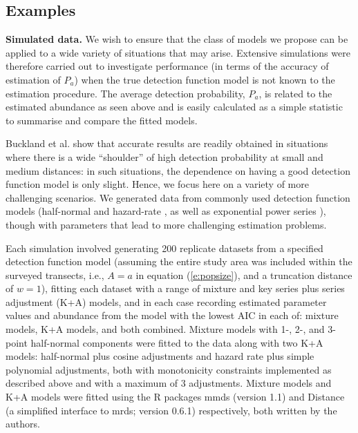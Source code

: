 \documentclass[10pt]{article}
\begin{document}
\subsection*{Examples}

\textbf{Simulated data.} We wish to ensure that the class of models we propose can be applied to a wide variety of situations that may arise. Extensive simulations were therefore carried out to investigate performance (in terms of the accuracy of estimation of $P_a$) when the true detection function model is not known to the estimation procedure. The average detection probability, $P_a$, is related to the estimated abundance as seen above and is easily calculated as a simple statistic to summarise and compare the fitted models.

Buckland et al. \cite{Buckland:2001vm} show that accurate results are readily obtained in situations where there is a wide ``shoulder'' of high detection probability at small and medium distances: in such situations, the dependence on having a good detection function model is only slight.  Hence, we focus here on a variety of more challenging scenarios. We generated data from commonly used detection function models (half-normal and hazard-rate \cite{Buckland:2001vm}, as well as exponential power series \cite{Otto:1990kk}), though with parameters that lead to more challenging estimation problems.

Each simulation involved generating 200 replicate datasets from a specified detection function model (assuming the entire study area was included within the surveyed transects, i.e., $A=a$ in equation (\ref{e:popsize}), and a truncation distance of $w=1$), fitting each dataset with a range of mixture and key series plus series adjustment (K+A) models, and in each case recording estimated parameter values and abundance from the model with the lowest AIC in each of: mixture models, K+A models, and both combined.  Mixture models with 1-, 2-, and 3-point half-normal components were fitted to the data along with two K+A models: half-normal plus cosine adjustments and hazard rate plus simple polynomial adjustments, both with monotonicity constraints implemented as described above and with a maximum of 3 adjustments. Mixture models and K+A models were fitted using the R packages mmds (version 1.1) and Distance \cite{Distance} (a simplified interface to mrds; version 0.6.1) respectively, both written by the authors.
\end{document}
